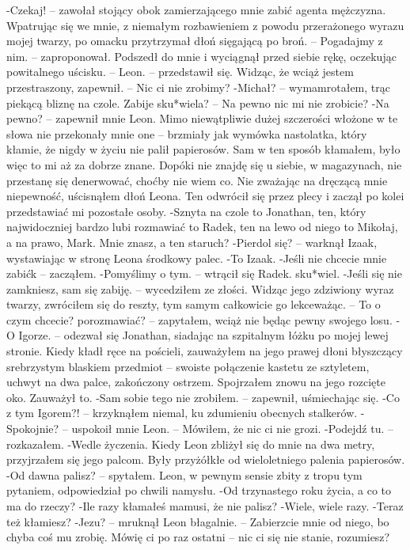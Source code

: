 \documentclass[../MAIN.tex]{subfiles}
\begin{document}
-Czekaj! -- zawołał stojący obok zamierzającego mnie zabić agenta mężczyzna. Wpatrując się we mnie, z niemałym rozbawieniem z powodu przerażonego wyrazu mojej twarzy, po omacku przytrzymał dłoń sięgającą po broń. -- Pogadajmy z nim. -- zaproponował. Podszedł do mnie i wyciągnął przed siebie rękę, oczekując powitalnego uścisku. -- Leon. -- przedstawił się. Widząc, że wciąż jestem przestraszony, zapewnił. -- Nic ci nie zrobimy?
-Michał? -- wymamrotałem, trąc piekącą bliznę na czole. Zabije sku*wiela? -- Na pewno nic mi nie zrobicie?
-Na pewno? -- zapewnił mnie Leon.
Mimo niewątpliwie dużej szczerości włożone w te słowa nie przekonały mnie one -- brzmiały jak wymówka nastolatka, który kłamie, że nigdy w życiu nie palił papierosów. Sam w ten sposób kłamałem, było więc to mi aż za dobrze znane.
Dopóki nie znajdę się u siebie, w magazynach, nie przestanę się denerwować, choćby nie wiem co.
Nie zważając na dręczącą mnie niepewność, uścisnąłem dłoń Leona. Ten odwrócił się przez plecy i zaczął po kolei przedstawiać mi pozostałe osoby.
-Sznyta na czole to Jonathan, ten, który najwidoczniej bardzo lubi rozmawiać to Radek, ten na lewo od niego to Mikołaj, a na prawo, Mark. Mnie znasz, a ten staruch?
-Pierdol się? -- warknął Izaak, wystawiając w stronę Leona środkowy palec.
-To Izaak.
-Jeśli nie chcecie mnie zabić\3k -- zacząłem.
-Pomyślimy o tym. -- wtrącił się Radek.
sku*wiel.
-Jeśli się nie zamkniesz, sam się zabiję. -- wycedziłem ze złości. Widząc jego zdziwiony wyraz twarzy, zwróciłem się do reszty, tym samym całkowicie go lekceważąc. -- To o czym chcecie? porozmawiać? -- zapytałem, wciąż nie będąc pewny swojego losu.
-O Igorze. -- odezwał się Jonathan, siadając na szpitalnym łóżku po mojej lewej stronie. Kiedy kładł ręce na pościeli, zauważyłem na jego prawej dłoni błyszczący srebrzystym blaskiem przedmiot -- swoiste połączenie kastetu ze sztyletem, uchwyt na dwa palce, zakończony ostrzem.
Spojrzałem znowu na jego rozcięte oko. Zauważył to.
-Sam sobie tego nie zrobiłem. -- zapewnił, uśmiechając się.
-Co z tym Igorem?! -- krzyknąłem niemal, ku zdumieniu obecnych stalkerów.
-Spokojnie? -- uspokoił mnie Leon. -- Mówiłem, że nic ci nie grozi.
-Podejdź tu. -- rozkazałem.
-Wedle życzenia.
Kiedy Leon zbliżył się do mnie na dwa metry, przyjrzałem się jego palcom.
Były przyżółkłe od wieloletniego palenia papierosów.
-Od dawna palisz? -- spytałem. Leon, w pewnym sensie zbity z tropu tym pytaniem, odpowiedział po chwili namysłu.
-Od trzynastego roku życia, a co to ma do rzeczy?
-Ile razy kłamałeś mamusi, że nie palisz?
-Wiele, wiele razy.
-Teraz też kłamiesz?
-Jezu? -- mruknął Leon błagalnie. -- Zabierzcie mnie od niego, bo chyba coś mu zrobię. Mówię ci po raz ostatni -- nic ci się nie stanie, rozumiesz?
\end{document}
